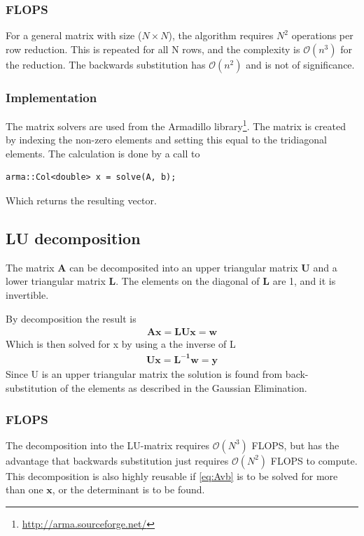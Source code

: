 \documentclass[11pt,a4paper,english,draft]{article}
\numberwithin{equation}{section}
\newcommand{\ve}[1]{\mathbf{#1}} %
\newcommand{\bigO}[1]{\mathcal{O}\left( #1 \right)}
\begin{document}
\subsubsection{FLOPS}
For a general matrix with size ($N\times N$), the algorithm requires
$N^2$ operations per row reduction. This is repeated for all N rows,
and the complexity is $\bigO{n^3}$ for the reduction. The backwards 
substitution has $\bigO{n^2}$ and is not of significance.



\subsubsection{Implementation}
\label{subsubsec:impl_gauss}
The matrix solvers are used from the Armadillo 
library\footnote{\url{http://arma.sourceforge.net/}}. The matrix is
created by indexing the non-zero elements and setting this equal to the 
tridiagonal elements. The calculation is done by a call to 
\begin{lstlisting}
arma::Col<double> x = solve(A, b);
\end{lstlisting}
Which returns the resulting vector.

\subsection{LU decomposition}

The matrix $\ve{A}$ can be decomposited into an upper triangular matrix $\ve{U}$ and 
a lower triangular matrix $\ve{L}$. The elements on the diagonal of $\ve{L}$ are 1,
and it is invertible.

By decomposition the result is
\begin{gather}
\ve{Ax} = \ve{LUx} = \ve{w}
\end{gather}
Which is then solved for x by using a the inverse of L
\begin{gather}
\ve{Ux} = \ve{L^{-1}w} = \ve{y}
\end{gather}
Since U is an upper triangular matrix the solution is found from back-substitution
of the elements as described in the Gaussian Elimination.

\subsubsection{FLOPS}
The decomposition into the LU-matrix requires $\bigO{N^3}$ FLOPS, but 
has the advantage that backwards substitution just requires $\bigO{N^2}$
FLOPS to compute. This decomposition is also highly reusable if \eqref{eq:Avb}
is to be solved for more than one $\ve{x}$, or the determinant is to be found.
\end{document}
